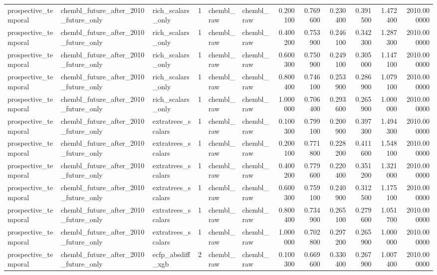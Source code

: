\begin{longtable}{lllrllrrrrrr}
prospective\_temporal & chembl\_future\_after\_2010\_future\_only & rich\_scalars\_only & 1 & chembl\_raw & chembl\_raw & 0.200100 & 0.769600 & 0.230400 & 0.391500 & 1.472400 & 2010.000000 \\
prospective\_temporal & chembl\_future\_after\_2010\_future\_only & rich\_scalars\_only & 1 & chembl\_raw & chembl\_raw & 0.400200 & 0.753900 & 0.246100 & 0.342300 & 1.287300 & 2010.000000 \\
prospective\_temporal & chembl\_future\_after\_2010\_future\_only & rich\_scalars\_only & 1 & chembl\_raw & chembl\_raw & 0.600300 & 0.750900 & 0.249100 & 0.305000 & 1.147100 & 2010.000000 \\
prospective\_temporal & chembl\_future\_after\_2010\_future\_only & rich\_scalars\_only & 1 & chembl\_raw & chembl\_raw & 0.800400 & 0.746100 & 0.253900 & 0.286900 & 1.079100 & 2010.000000 \\
prospective\_temporal & chembl\_future\_after\_2010\_future\_only & rich\_scalars\_only & 1 & chembl\_raw & chembl\_raw & 1.000000 & 0.706400 & 0.293600 & 0.265900 & 1.000000 & 2010.000000 \\
prospective\_temporal & chembl\_future\_after\_2010\_future\_only & extratrees\_scalars & 1 & chembl\_raw & chembl\_raw & 0.100300 & 0.799100 & 0.200900 & 0.397300 & 1.494300 & 2010.000000 \\
prospective\_temporal & chembl\_future\_after\_2010\_future\_only & extratrees\_scalars & 1 & chembl\_raw & chembl\_raw & 0.200100 & 0.771800 & 0.228200 & 0.411600 & 1.548100 & 2010.000000 \\
prospective\_temporal & chembl\_future\_after\_2010\_future\_only & extratrees\_scalars & 1 & chembl\_raw & chembl\_raw & 0.400200 & 0.779600 & 0.220400 & 0.351200 & 1.321000 & 2010.000000 \\
prospective\_temporal & chembl\_future\_after\_2010\_future\_only & extratrees\_scalars & 1 & chembl\_raw & chembl\_raw & 0.600300 & 0.759100 & 0.240900 & 0.312500 & 1.175100 & 2010.000000 \\
prospective\_temporal & chembl\_future\_after\_2010\_future\_only & extratrees\_scalars & 1 & chembl\_raw & chembl\_raw & 0.800400 & 0.734900 & 0.265100 & 0.279600 & 1.051700 & 2010.000000 \\
prospective\_temporal & chembl\_future\_after\_2010\_future\_only & extratrees\_scalars & 1 & chembl\_raw & chembl\_raw & 1.000000 & 0.702800 & 0.297200 & 0.265900 & 1.000000 & 2010.000000 \\
prospective\_temporal & chembl\_future\_after\_2010\_future\_only & ecfp\_absdiff\_xgb & 2 & chembl\_raw & chembl\_raw & 0.100300 & 0.669600 & 0.330400 & 0.267900 & 1.007400 & 2010.000000 \\

\end{longtable}
